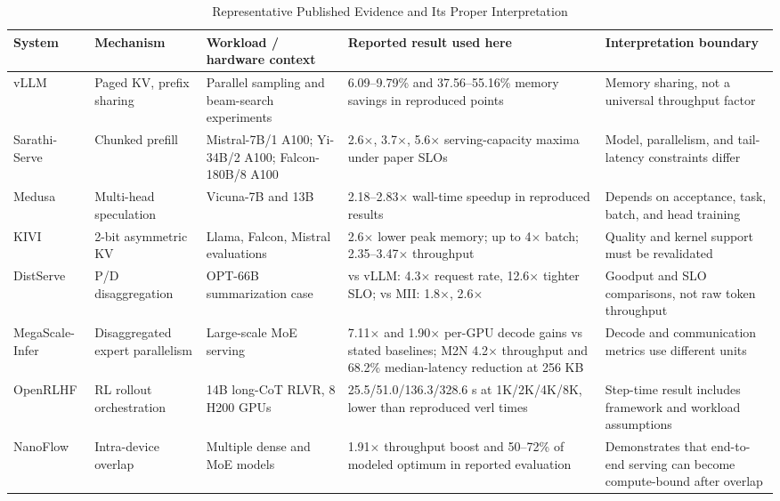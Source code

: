 \documentclass[journal]{IEEEtran}
\begin{document}
\begin{table}[t]
\caption{Representative Published Evidence and Its Proper Interpretation}
\label{tab:evidence}
\centering
\scriptsize
\begin{tabularx}{\textwidth}{@{}p{}p{}p{}p{}X@{}}
\toprule
System & Mechanism & Workload / hardware context & Reported result used here & Interpretation boundary \\
\midrule
vLLM \cite{kwon2023vllm} & Paged KV, prefix sharing & Parallel sampling and beam-search experiments & 6.09--9.79\% and 37.56--55.16\% memory savings in reproduced points & Memory sharing, not a universal throughput factor \\
Sarathi-Serve \cite{agrawal2024sarathi} & Chunked prefill & Mistral-7B/1 A100; Yi-34B/2 A100; Falcon-180B/8 A100 & 2.6$\times$, 3.7$\times$, 5.6$\times$ serving-capacity maxima under paper SLOs & Model, parallelism, and tail-latency constraints differ \\
Medusa \cite{cai2024medusa} & Multi-head speculation & Vicuna-7B and 13B & 2.18--2.83$\times$ wall-time speedup in reproduced results & Depends on acceptance, task, batch, and head training \\
KIVI \cite{liu2024kivi} & 2-bit asymmetric KV & Llama, Falcon, Mistral evaluations & 2.6$\times$ lower peak memory; up to 4$\times$ batch; 2.35--3.47$\times$ throughput & Quality and kernel support must be revalidated \\
DistServe \cite{zhong2024distserve} & P/D disaggregation & OPT-66B summarization case & vs vLLM: 4.3$\times$ request rate, 12.6$\times$ tighter SLO; vs MII: 1.8$\times$, 2.6$\times$ & Goodput and SLO comparisons, not raw token throughput \\
MegaScale-Infer \cite{zhu2025megascale} & Disaggregated expert parallelism & Large-scale MoE serving & 7.11$\times$ and 1.90$\times$ per-GPU decode gains vs stated baselines; M2N 4.2$\times$ throughput and 68.2\% median-latency reduction at 256 KB & Decode and communication metrics use different units \\
OpenRLHF \cite{hu2025openrlhf} & RL rollout orchestration & 14B long-CoT RLVR, 8 H200 GPUs & 25.5/51.0/136.3/328.6 s at 1K/2K/4K/8K, lower than reproduced verl times & Step-time result includes framework and workload assumptions \\
NanoFlow \cite{zhu2025nanoflow} & Intra-device overlap & Multiple dense and MoE models & 1.91$\times$ throughput boost and 50--72\% of modeled optimum in reported evaluation & Demonstrates that end-to-end serving can become compute-bound after overlap \\
\bottomrule
\end{tabularx}
\end{table}
\end{document}
